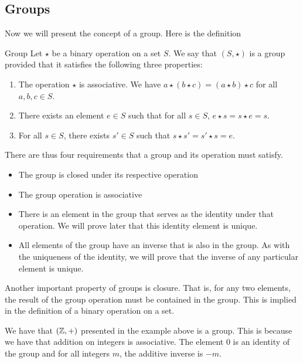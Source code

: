 \documentclass[main.tex]{subfiles}
\begin{document}
    \subsection{Groups}
    Now we will present the concept of a group. Here is the definition 
    \begin{defn}{Group}{}
        Let $\star$ be a binary operation on a set $S$. We say that $(S, \star)$ is a group provided that it satisfies the following three properties:
        \begin{enumerate}
            \item The operation $\star$ is associative. We have $a\star (b\star c) = (a\star b) \star c$ for all $a,b,c\in S$.

            \item There exists an element $e\in S$ such that for all $s\in S$, $e\star s = s\star e = s$.

            \item For all $s\in S$, there exists $s'\in S$ such that $s\star s' = s'\star s = e$.
        \end{enumerate}
    \end{defn}
    There are thus four requirements that a group and its operation must satisfy. 
    \begin{itemize}
        \item The group is closed under its respective operation
        \item The group operation is associative 
        \item There is an element in the group that serves as the identity under that operation. We will prove later that this identity element is unique.
        \item All elements of the group have an inverse that is also in the group. As with the uniqueness of the identity, we will prove that the inverse of any particular element is unique.
    \end{itemize}
    Another important property of groups is closure. That is, for any two elements, the result of the group operation must be contained in the group. This is implied in the definition of a binary operation on a set.

    \begin{example}{}{}
        We have that $(\mathbb{Z}, +)$ presented in the example above is a group. This is because we have that addition on integers is associative. The element 0 is an identity of the group and for all integers $m$, the additive inverse is $-m$.
    \end{example}
\end{document}
